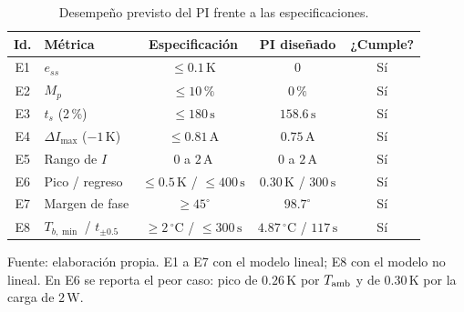 \begin{table}[!htbp]\centering
\caption{Desempeño previsto del PI frente a las especificaciones.}\label{tab:prediccion}
{\tableformat
\begin{tabular}{clccc}\toprule
Id. & Métrica & Especificación & PI diseñado & ¿Cumple?\\\midrule
E1 & $e_{ss}$ & $\le0.1\,\mathrm K$ & $0$ & Sí\\
E2 & $M_p$ & $\le10\,\%$ & $0\,\%$ & Sí\\
E3 & $t_s$ (2\,\%) & $\le180\,\mathrm s$ & $158.6\,\mathrm s$ & Sí\\
E4 & $\Delta I_{\max}$ ($-1\,\mathrm K$) & $\le0.81\,\mathrm A$ & $0.75\,\mathrm A$ & Sí\\
E5 & Rango de $I$ & $0$ a $2\,\mathrm A$ & $0$ a $2\,\mathrm A$ & Sí\\
E6 & Pico / regreso & $\le0.5\,\mathrm K$ / $\le400\,\mathrm s$ & $0.30\,\mathrm K$ / $300\,\mathrm s$ & Sí\\
E7 & Margen de fase & $\ge45^\circ$ & $98.7^\circ$ & Sí\\
E8 & $T_{b,\min}$ / $t_{\pm0.5}$ & $\ge2\,^\circ\mathrm C$ / $\le300\,\mathrm s$ & $4.87\,^\circ\mathrm C$ / $117\,\mathrm s$ & Sí\\\bottomrule
\end{tabular}}
\par\smallskip\footnotesize Fuente: elaboración propia. E1 a E7 con el modelo lineal; E8 con el modelo no lineal. En E6 se reporta el peor caso: pico de $0.26\,\mathrm K$ por $T_{\rm amb}$ y de $0.30\,\mathrm K$ por la carga de $2\,\mathrm W$.
\end{table}
